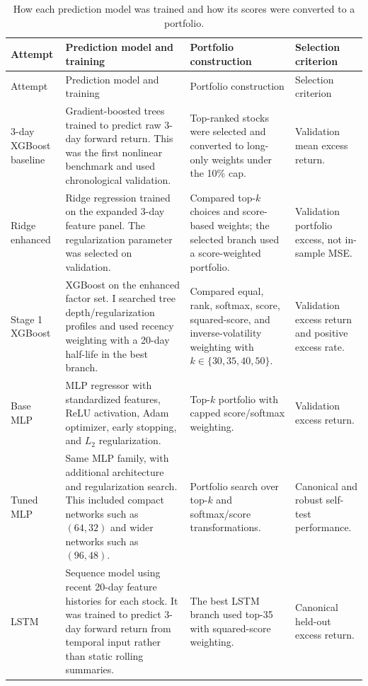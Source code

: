 \documentclass[11pt]{article}
\begin{document}
{\small
\setlength{\tabcolsep}{4pt}
\begin{longtable}{p{}p{}p{}p{}}
\caption{How each prediction model was trained and how its scores were converted to a portfolio.}
\label{tab:model-by-attempt}\\
\toprule
Attempt & Prediction model and training & Portfolio construction & Selection criterion \\
\midrule
\endfirsthead
\toprule
Attempt & Prediction model and training & Portfolio construction & Selection criterion \\
\midrule
\endhead
3-day XGBoost baseline &
Gradient-boosted trees trained to predict raw 3-day forward return. This was
the first nonlinear benchmark and used chronological validation. &
Top-ranked stocks were selected and converted to long-only weights under the
10\% cap. &
Validation mean excess return. \\
\midrule
Ridge enhanced &
Ridge regression trained on the expanded 3-day feature panel. The regularization
parameter was selected on validation. &
Compared top-\(k\) choices and score-based weights; the selected branch used a
score-weighted portfolio. &
Validation portfolio excess, not in-sample MSE. \\
\midrule
Stage 1 XGBoost &
XGBoost on the enhanced factor set. I searched tree depth/regularization
profiles and used recency weighting with a 20-day half-life in the best branch. &
Compared equal, rank, softmax, score, squared-score, and inverse-volatility
weighting with \(k\in\{30,35,40,50\}\). &
Validation excess return and positive excess rate. \\
\midrule
Base MLP &
MLP regressor with standardized features, ReLU activation, Adam optimizer, early
stopping, and \(L_2\) regularization. &
Top-\(k\) portfolio with capped score/softmax weighting. &
Validation excess return. \\
\midrule
Tuned MLP &
Same MLP family, with additional architecture and regularization search. This
included compact networks such as \((64,32)\) and wider networks such as
\((96,48)\). &
Portfolio search over top-\(k\) and softmax/score transformations. &
Canonical and robust self-test performance. \\
\midrule
LSTM &
Sequence model using recent 20-day feature histories for each stock. It was
trained to predict 3-day forward return from temporal input rather than static
rolling summaries. &
The best LSTM branch used top-35 with squared-score weighting. &
Canonical held-out excess return. \\

\end{longtable}}
\end{document}

